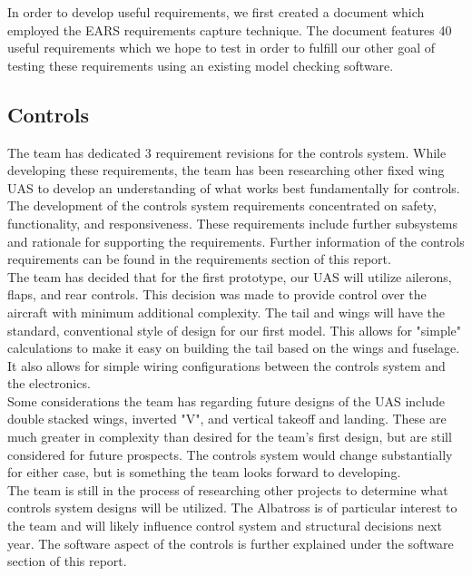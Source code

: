 ﻿\documentclass{article}
\begin{document}
\noindent In order to develop useful requirements, we first created a document which employed the EARS requirements capture technique. The document features 40 useful requirements which we hope to test in order to fulfill our other goal of testing these requirements using an existing model checking software.\\

\subsection{Controls}
\noindent The team has dedicated 3 requirement revisions for the controls system. While developing these requirements, the team has been researching other fixed wing UAS to develop an understanding of what works best fundamentally for controls.\\

\noindent The development of the controls system requirements concentrated on safety, functionality, and responsiveness. These requirements include further subsystems and rationale for supporting the requirements. Further information of the controls requirements can be found in the requirements section of this report. \\

\noindent The team has decided that for the first prototype, our UAS will utilize ailerons, flaps, and rear controls. This decision was made to provide control over the aircraft with minimum additional complexity. The tail and wings will have the standard, conventional style of design for our first model. This allows for "simple" calculations to make it easy on building the tail based on the wings and fuselage. It also allows for simple wiring configurations between the controls system and the electronics. \\

\noindent Some considerations the team has regarding future designs of the UAS include double stacked wings, inverted "V", and vertical takeoff and landing. These are much greater in complexity than desired for the team's first design, but are still considered for future prospects. The controls system would change substantially for either case, but is something the team looks forward to developing. \\

\noindent The team is still in the process of researching other projects to determine what controls system designs will be utilized. The Albatross is of particular interest to the team and will likely influence control system and structural decisions next year. The software aspect of the controls is further explained under the software section of this report. \\
\end{document}
